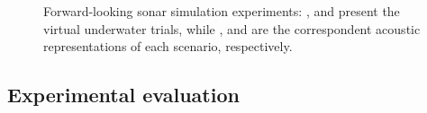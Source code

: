 \documentclass[final,5p,times]{elsarticle}
\begin{document}
\begin{figure}[!ht]
{        \label{fig:fls_sim2}
    }
    \setcounter{subfigure}{2}
    \setcounter{subfigure}{5}
    \captionsetup{justification=justified}
    \caption{Forward-looking sonar simulation experiments:
    ,  and 
    present the virtual underwater trials, while ,
     and  are the correspondent acoustic
    representations of each scenario, respectively.}
    \label{fig:fls}
\end{figure}

\subsection{Experimental evaluation}
\end{document}
